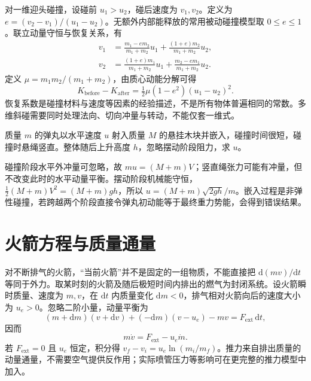 \documentclass[UTF8,12pt,a4paper,fontset=fandol]{ctexbook}
\begin{document}
对一维迎头碰撞，设碰前 $u_1>u_2$，碰后速度为 $v_1,v_2$。定义为 $e=(v_2-v_1)/(u_1-u_2)$。无额外内部能释放的常用被动碰撞模型取 $0\le e\le1$。联立动量守恒与恢复关系，有
\begin{align}
 v_1&=\frac{m_1-em_2}{m_1+m_2}u_1+\frac{(1+e)m_2}{m_1+m_2}u_2,\label{eq:mech-collision1}\\
 v_2&=\frac{(1+e)m_1}{m_1+m_2}u_1+\frac{m_2-em_1}{m_1+m_2}u_2.
\end{align}
定义 $\mu=m_1m_2/(m_1+m_2)$，由质心动能分解可得
\begin{equation}
 K_{\mathrm{before}}-K_{\mathrm{after}}=\tfrac12\mu(1-e^2)(u_1-u_2)^2.
 \label{eq:mech-collision-loss}
\end{equation}
恢复系数是碰撞材料与速度等因素的经验描述，不是所有物体普遍相同的常数。多维斜碰需要同时处理法向、切向冲量与转动，不能仅套一维式。

\begin{example}[弹道摆的两个阶段]
质量 $m$ 的弹丸以水平速度 $u$ 射入质量 $M$ 的悬挂木块并嵌入，碰撞时间很短，碰撞时悬绳竖直。整体随后上升高度 $h$，忽略摆动阶段阻力，求 $u$。
\end{example}
\begin{solve}
碰撞阶段水平外冲量可忽略，故 $mu=(M+m)V$；竖直绳张力可能有冲量，但不改变此时的水平动量平衡。摆动阶段机械能守恒，$\tfrac12(M+m)V^2=(M+m)gh$，所以 $u=(M+m)\sqrt{2gh}/m$。嵌入过程是非弹性碰撞，若跨越两个阶段直接令弹丸初动能等于最终重力势能，会得到错误结果。
\end{solve}

\section{火箭方程与质量通量}
对不断排气的火箭，“当前火箭”并不是固定的一组物质，不能直接把 $\mathrm d(mv)/\mathrm dt$ 等同于外力。取某时刻的火箭及随后极短时间内排出的燃气为封闭系统。设火箭瞬时质量、速度为 $m,v$，在 $\mathrm dt$ 内质量变化 $\mathrm dm<0$，排气相对火箭向后的速度大小为 $u_e>0$。忽略二阶小量，动量平衡为
\[
 (m+\mathrm dm)(v+\mathrm dv)+(-\mathrm dm)(v-u_e)-mv=F_{\mathrm{ext}}\,\mathrm dt,
\]
因而
\begin{equation}
 m\dot v=F_{\mathrm{ext}}-u_e\dot m.
 \label{eq:mech-rocket}
\end{equation}
若 $F_{\mathrm{ext}}=0$ 且 $u_e$ 恒定，积分得 $v_f-v_i=u_e\ln(m_i/m_f)$。推力来自排出质量的动量通量，不需要空气提供反作用；实际喷管压力等影响可在更完整的推力模型中加入。
\end{document}
